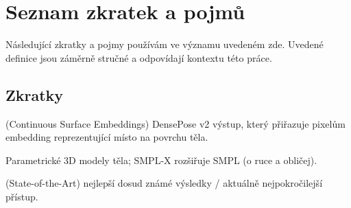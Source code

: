 \documentclass[11pt,a4paper,twoside,openright]{report}
\begin{document}


\setcounter{tocdepth}{2}
\tableofcontents

\chapter*{Seznam zkratek a pojmů}

Následující zkratky a pojmy používám ve významu uvedeném zde. Uvedené definice jsou záměrně stručné a odpovídají kontextu této práce.

\section*{Zkratky}
\begin{description}[style=nextline]
    \item[CSE] (Continuous Surface Embeddings) DensePose v2 výstup, který přiřazuje pixelům embedding reprezentující místo na povrchu těla.
    \item[SMPL / SMPL-X] Parametrické 3D modely těla; SMPL-X rozšiřuje SMPL (o ruce a obličej).
    \item[SOTA] (State-of-the-Art) nejlepší dosud známé výsledky / aktuálně nejpokročilejší přístup.
\end{description}
\end{document}
